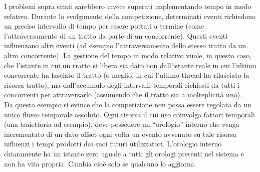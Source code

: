 I problemi sopra citati sarebbero invece superati implementando tempo in modo
relativo. Durante lo svolgimento della competizione, 
determinati eventi richiedono un preciso
intervallo di tempo per essere portati a termine (come l'attraversamento di un
tratto da parte di un concorrente). 
Questi eventi influenzano altri eventi (ad esempio
l'attraversamento dello stesso tratto da un altro concorrente). 
La gestione del tempo in modo relativo vuole, in questo caso, che l'istante in
cui un tratto si libera sia dato
non dall'istante reale in cui l'ultimo concorrente ha lasciato il tratto (o
meglio, in cui l'ultimo thread ha rilasciato
la risorsa tratto), ma dall'accumulo degli intervalli temporali richiesti da
tutti i concorrenti per attraversarlo (assumendo che il tratto
sia a molteplicità uno).\\
Da questo esempio si evince che la competizione non possa essere regolata da un
unico flusso temporale assoluto. Ogni risorsa il cui uso
coinvolga fattori temporali (una traiettoria ad esempio), deve
possedere un ``orologio'' interno che venga incrementato di un dato offset ogni
volta un evento avvenuto su tale risorsa influenzi i tempi
prodotti dai suoi futuri utilizzatori. L'orologio interno chiaramente ha un
istante zero uguale a tutti gli orologi presenti nel sistema
e non ha vita propria. Cambia cioè solo se qualcuno lo aggiorna.\\
